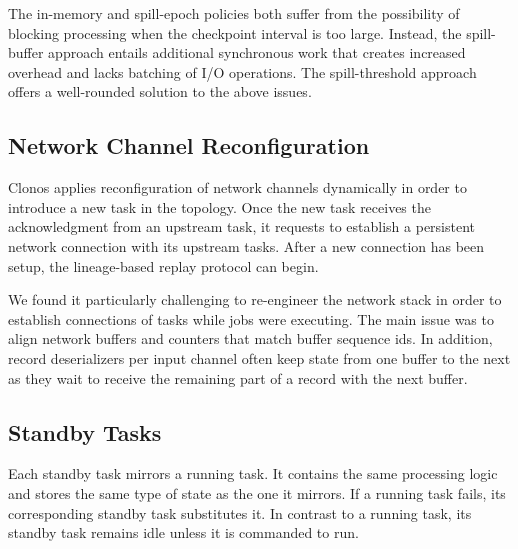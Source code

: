 \documentclass[sigconf]{acmart}
\newcounter{AsteriosNOC}
\newcommand{\asterios}[1]{\noindent\textcolor{purple}{\small \bf [Asterios\#\arabic{AsteriosNOC}\stepcounter{AsteriosNOC}: #1]}}
\begin{document}
The in-memory and spill-epoch policies both suffer from the possibility of blocking processing when the checkpoint interval is too large.
Instead, the spill-buffer approach entails additional synchronous work that creates increased overhead and lacks batching of I/O operations.
The spill-threshold approach offers a well-rounded solution to the above issues.



\subsection{Network Channel Reconfiguration}

Clonos applies reconfiguration of network channels dynamically in order to introduce a new task in the topology.
Once the new task receives the acknowledgment from an upstream task, it requests to establish a persistent network connection with its upstream tasks.
After a new connection has been setup, the lineage-based replay protocol can begin.

We found it particularly challenging to re-engineer the network stack in order to establish connections of tasks while jobs were executing. The main issue was to align network buffers and counters that match buffer sequence ids. In addition, record deserializers per input channel often keep state from one buffer to the next as they wait to receive the remaining part of a record with the next buffer.



\subsection{Standby Tasks}

Each standby task mirrors a running task.
It contains the same processing logic and stores the same type of state as the one it mirrors.
If a running task fails, its corresponding standby task substitutes it.
In contrast to a running task, its standby task remains idle unless it is commanded to run.
\end{document}
